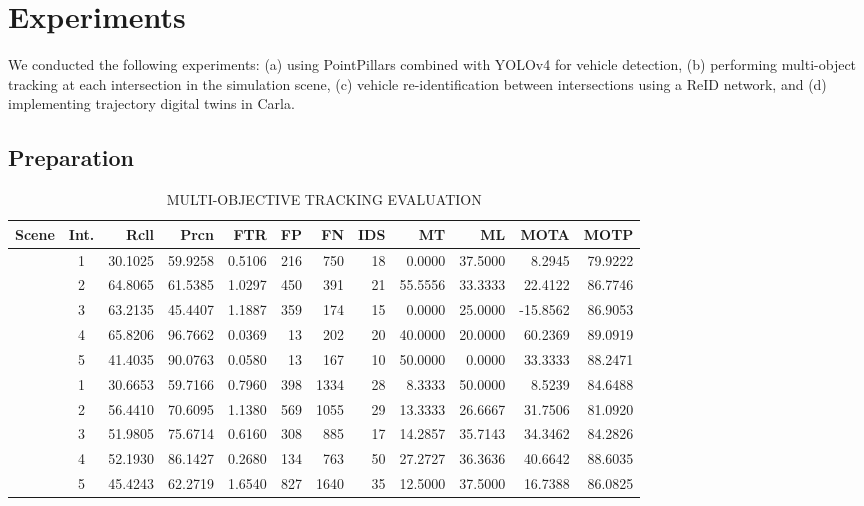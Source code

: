 \documentclass[lettersize,journal]{IEEEtran}
\begin{document}
\section{Experiments}

We conducted the following experiments: 
(a) using PointPillars combined with YOLOv4 for vehicle detection, 
(b) performing multi-object tracking at each intersection in the simulation scene,
(c) vehicle re-identification between intersections using a ReID network, and 
(d) implementing trajectory digital twins in Carla.

\subsection{Preparation}

\begin{table}[t]
	\centering
	\caption{MULTI-OBJECTIVE TRACKING EVALUATION}
	\label{tab:tracking_eval}
	\small
	\begin{tabular}{@{}l@{\hspace{1em}}c@{\hspace{0.5em}}*{10}{r}@{}}
		\toprule
		\textbf{Scene} & \textbf{Int.} & \textbf{Rcll} & \textbf{Prcn} & \textbf{FTR} & \textbf{FP} & \textbf{FN} & \textbf{IDS} & \textbf{MT} & \textbf{ML} & \textbf{MOTA} & \textbf{MOTP} \\
		\midrule
		& 1 & 30.1025 & 59.9258 & 0.5106 & 216 & 750 & 18 & 0.0000 & 37.5000 & 8.2945 & 79.9222\\
		& 2 & 64.8065 & 61.5385 & 1.0297 & 450 & 391 & 21 & 55.5556 & 33.3333 & 22.4122 & 86.7746\\
		& 3 & 63.2135 & 45.4407 & 1.1887 & 359 & 174 & 15 & 0.0000 & 25.0000 & -15.8562 & 86.9053\\
		& 4 & 65.8206 & 96.7662 & 0.0369 & 13 & 202 & 20 & 40.0000 & 20.0000 & 60.2369 & 89.0919\\
		& 5 & 41.4035 & 90.0763 & 0.0580 & 13 & 167 & 10 & 50.0000 & 0.0000 & 33.3333 & 88.2471\\
		\midrule
		& 1 & 30.6653 & 59.7166 & 0.7960 & 398 & 1334 & 28 & 8.3333 & 50.0000 & 8.5239 & 84.6488\\
		& 2 & 56.4410 & 70.6095 & 1.1380 & 569 & 1055 & 29 & 13.3333 & 26.6667 & 31.7506 & 81.0920\\
		& 3 & 51.9805 & 75.6714 & 0.6160 & 308 & 885 & 17 & 14.2857 & 35.7143 & 34.3462 & 84.2826\\
		& 4 & 52.1930 & 86.1427 & 0.2680 & 134 & 763 & 50 & 27.2727 & 36.3636 & 40.6642 & 88.6035\\
		& 5 & 45.4243 & 62.2719 & 1.6540 & 827 & 1640 & 35 & 12.5000 & 37.5000 & 16.7388 & 86.0825\\
		\bottomrule
	\end{tabular}
\end{table}
\end{document}
